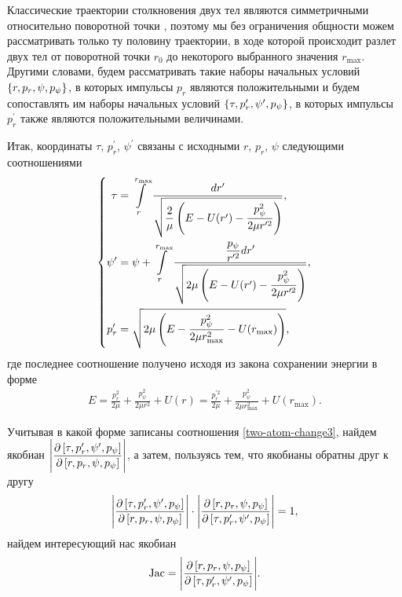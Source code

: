 Классические траектории столкновения двух тел являются симметричными относительно поворотной точки \cite{goldstein}, поэтому мы без ограничения общности можем рассматривать только ту половину траектории, в ходе которой происходит разлет двух тел от поворотной точки $r_0$ до некоторого выбранного значения $r_\text{max}$. Другими словами, будем рассматривать такие наборы начальных условий $\left\{ r, p_r, \psi, p_\psi \right\}$,  в которых импульсы $p_r$ являются положительными и будем сопоставлять им наборы начальных условий $\left\{ \tau, p_r^\prime, \psi^\prime, p_\psi \right\}$, в которых импульсы $p_r^\prime$ также являются положительными величинами. \par
Итак, координаты $\tau$, $p_r^\prime$, $\psi^\prime$ связаны с исходными $r$, $p_r$, $\psi$ следующими соотношениями
\begin{gather}
    \left\{
    \begin{aligned}
        \tau &= \int\limits_r^{r_\text{max}} \frac{dr^\prime}{\displaystyle \sqrt{\frac{2}{\mu} \left( E - U(r^\prime) - \frac{p_\psi^2}{2 \mu r^{\prime 2}} \right)}}, \\
        \psi^\prime &= \psi + \int\limits_r^{r_\text{max}} \frac{\displaystyle \frac{p_\psi}{r^{\prime 2}} dr^\prime}{\displaystyle \sqrt{2\mu \left( E - U(r^\prime) - \frac{p_\psi^2}{2 \mu r^{\prime 2}} \right)}}, \\
        p_r^\prime &= \sqrt{2 \mu \left( E - \frac{p_\psi^2}{2 \mu r_\text{max}^2} - U(r_\text{max}) \right)},
    \end{aligned}
    \right. \label{two-atom-change3}
\end{gather}
%
где последнее соотношение получено исходя из закона сохранении энергии в форме
\begin{gather}
    E = \frac{p_r^2}{2\mu} + \frac{p_\psi^2}{2 \mu r^2} + U(r) = \frac{p_r^{\prime 2}}{2 \mu} + \frac{p_\psi^2}{2 \mu r_\text{max}^2} + U(r_\text{max}). 
\end{gather}

Учитывая в какой форме записаны соотношения \eqref{two-atom-change3}, найдем якобиан $\displaystyle \Bigg\vert \frac{\partial \left[ \tau, p_r^\prime, \psi^\prime, p_\psi \right]}{\partial \left[ r, p_r, \psi, p_\psi \right]} \Bigg \vert$, а затем, пользуясь тем, что якобианы обратны друг к другу
\begin{gather}
    \Bigg\vert \frac{\partial \left[ \tau, p_r^\prime, \psi^\prime, p_\psi \right]}{\partial \left[ r, p_r, \psi, p_\psi \right]} \Bigg \vert \cdot \Bigg\vert \frac{\partial \left[ r, p_r, \psi, p_\psi \right]}{\partial \left[ \tau, p_r^\prime, \psi^\prime, p_\psi \right]} \Bigg \vert = 1,
\end{gather}
%
найдем интересующий нас якобиан
\begin{gather}
    \text{Jac} = \Bigg\vert \frac{\partial \left[ r, p_r, \psi, p_\psi \right]}{ \partial \left[ \tau, p_r^\prime, \psi^\prime, p_\psi \right]} \Bigg\vert.
\end{gather}

